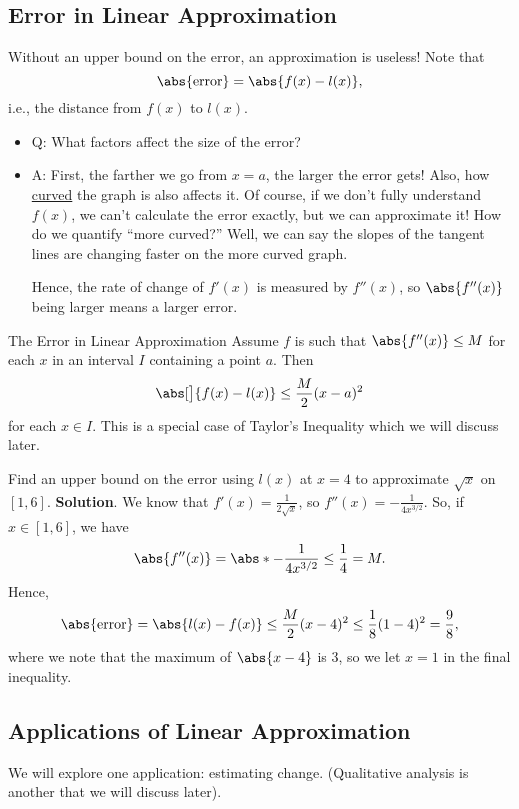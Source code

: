 \subsection{Error in Linear Approximation}
Without an upper bound on the error, an approximation is useless! Note that
\[ \abs{\text{error}}=\abs{f(x)-l(x)}, \]
i.e., the distance from $ f(x) $ to $ l(x) $.
\begin{itemize}
    \item Q\@: What factors affect the size of the error?
    \item A\@: First, the farther we go from $ x=a $, the larger the error gets!
          Also, how \underline{curved} the graph is also affects it. Of course, if we don't fully understand $ f(x) $,
          we can't calculate the error exactly, but we can approximate it! How do we quantify
          ``more curved?'' Well, we can say the slopes of the tangent lines are changing faster on the more curved graph.

          Hence, the rate of change of $ f'(x) $ is measured by $ f''(x) $, so $ \abs{f''(x)} $ being larger means a larger error.
\end{itemize}
\begin{Theorem}{The Error in Linear Approximation}{}
    Assume $ f $ is such that $ \abs{f''(x)}\le M $ for each $ x $ in an interval $ I $ containing a point $ a $. Then
    \[ \abs[\big]{f(x)-l(x)}\le \frac{M}{2}(x-a)^2 \]
    for each $ x\in I $.
    \tcblower{}
    This is a special case of Taylor's Inequality which we will discuss later.
\end{Theorem}
\begin{Example}{}{}
    Find an upper bound on the error using $ l(x) $ at $ x=4 $ to approximate $ \sqrt{x} $ on $ [1,6] $.
    \tcblower{}
    \textbf{Solution}. We know that $ f'(x)=\frac{1}{2\sqrt{x}} $, so $ f''(x)=-\frac{1}{4x^{3/2}} $. So, if
    $ x\in[1,6] $, we have
    \[ \abs{f''(x)}= \abs*{-\frac{1}{4x^{3/2}}}\le \frac{1}{4}=M. \]
    Hence,
    \[ \abs{\text{error}}=\abs{l(x)-f(x)}\le \frac{M}{2}(x-4)^2\le \frac{1}{8}(1-4)^2=\frac{9}{8}, \]
    where we note that the maximum of $ \abs{x-4} $ is $ 3 $, so we let $ x=1 $ in the final inequality.
\end{Example}
\subsection{Applications of Linear Approximation}
We will explore one application: estimating change. (Qualitative analysis is another that we will discuss later).


